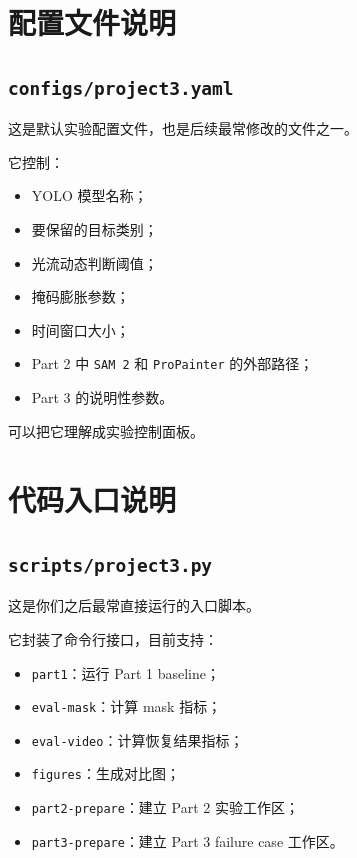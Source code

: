 \documentclass[11pt,a4paper,fontset=none]{ctexart}
\begin{document}
\section{配置文件说明}

\subsection{\texttt{configs/project3.yaml}}

这是默认实验配置文件，也是后续最常修改的文件之一。

它控制：

\begin{itemize}
  \item YOLO 模型名称；
  \item 要保留的目标类别；
  \item 光流动态判断阈值；
  \item 掩码膨胀参数；
  \item 时间窗口大小；
  \item Part 2 中 \texttt{SAM 2} 和 \texttt{ProPainter} 的外部路径；
  \item Part 3 的说明性参数。
\end{itemize}

可以把它理解成实验控制面板。

\section{代码入口说明}

\subsection{\texttt{scripts/project3.py}}

这是你们之后最常直接运行的入口脚本。

它封装了命令行接口，目前支持：

\begin{itemize}
  \item \texttt{part1}：运行 Part 1 baseline；
  \item \texttt{eval-mask}：计算 mask 指标；
  \item \texttt{eval-video}：计算恢复结果指标；
  \item \texttt{figures}：生成对比图；
  \item \texttt{part2-prepare}：建立 Part 2 实验工作区；
  \item \texttt{part3-prepare}：建立 Part 3 failure case 工作区。
\end{itemize}
\end{document}
